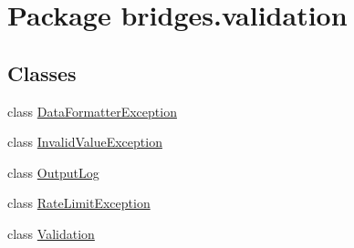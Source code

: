 \hypertarget{namespacebridges_1_1validation}{}\section{Package bridges.\+validation}
\label{namespacebridges_1_1validation}
\subsection*{Classes}
\begin{DoxyCompactItemize}
\item 
class \hyperlink{classbridges_1_1validation_1_1_data_formatter_exception}{Data\+Formatter\+Exception}
\item 
class \hyperlink{classbridges_1_1validation_1_1_invalid_value_exception}{Invalid\+Value\+Exception}
\item 
class \hyperlink{classbridges_1_1validation_1_1_output_log}{Output\+Log}
\item 
class \hyperlink{classbridges_1_1validation_1_1_rate_limit_exception}{Rate\+Limit\+Exception}
\item 
class \hyperlink{classbridges_1_1validation_1_1_validation}{Validation}
\end{DoxyCompactItemize}
